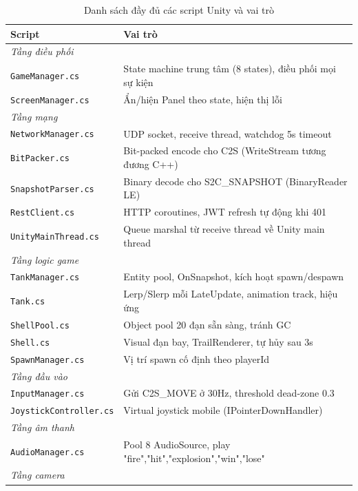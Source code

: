 \documentclass[12pt,a4paper]{report}
\begin{document}
\begin{table}[H]
\centering
\caption{Danh sách đầy đủ các script Unity và vai trò}
\label{tab:unityscripts}
\begin{tabularx}{\textwidth}{lX}
\toprule
\textbf{Script} & \textbf{Vai trò} \\
\midrule
\multicolumn{2}{l}{\textit{Tầng điều phối}} \\
\texttt{GameManager.cs}    & State machine trung tâm (8 states), điều phối mọi sự kiện \\
\texttt{ScreenManager.cs}  & Ẩn/hiện Panel theo state, hiện thị lỗi \\
\midrule
\multicolumn{2}{l}{\textit{Tầng mạng}} \\
\texttt{NetworkManager.cs} & UDP socket, receive thread, watchdog 5s timeout \\
\texttt{BitPacker.cs}      & Bit-packed encode cho C2S (WriteStream tương đương C++) \\
\texttt{SnapshotParser.cs} & Binary decode cho S2C\_SNAPSHOT (BinaryReader LE) \\
\texttt{RestClient.cs}     & HTTP coroutines, JWT refresh tự động khi 401 \\
\texttt{UnityMainThread.cs}& Queue marshal từ receive thread về Unity main thread \\
\midrule
\multicolumn{2}{l}{\textit{Tầng logic game}} \\
\texttt{TankManager.cs}    & Entity pool, OnSnapshot, kích hoạt spawn/despawn \\
\texttt{Tank.cs}           & Lerp/Slerp mỗi LateUpdate, animation track, hiệu ứng \\
\texttt{ShellPool.cs}      & Object pool 20 đạn sẵn sàng, tránh GC \\
\texttt{Shell.cs}          & Visual đạn bay, TrailRenderer, tự hủy sau 3s \\
\texttt{SpawnManager.cs}   & Vị trí spawn cố định theo playerId \\
\midrule
\multicolumn{2}{l}{\textit{Tầng đầu vào}} \\
\texttt{InputManager.cs}   & Gửi C2S\_MOVE ở 30Hz, threshold dead-zone 0.3 \\
\texttt{JoystickController.cs} & Virtual joystick mobile (IPointerDownHandler) \\
\midrule
\multicolumn{2}{l}{\textit{Tầng âm thanh}} \\
\texttt{AudioManager.cs}   & Pool 8 AudioSource, play "fire","hit","explosion","win","lose" \\
\midrule
\multicolumn{2}{l}{\textit{Tầng camera}} \\

\end{tabularx}
\end{table}
\end{document}
